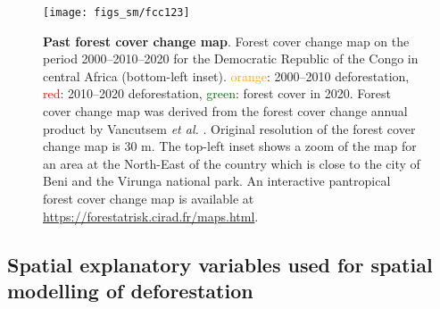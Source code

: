 \documentclass[
  12pt,
]{article}
\begin{document}
\begin{figure}[H]

{\centering \texttt{[image: figs\_sm/fcc123]} 

}

\caption{\textbf{Past forest cover change map}. Forest cover change map on the period 2000--2010--2020 for the Democratic Republic of the Congo in central Africa (bottom-left inset). \textcolor{orange}{orange}: 2000--2010 deforestation, \textcolor{red}{red}: 2010--2020 deforestation, \textcolor{darkgreen}{green}: forest cover in 2020. Forest cover change map was derived from the forest cover change annual product by Vancutsem \emph{et al.} \citep{Vancutsem2021}. Original resolution of the forest cover change map is 30 m. The top-left inset shows a zoom of the map for an area at the North-East of the country which is close to the city of Beni and the Virunga national park. An interactive pantropical forest cover change map is available at \url{https://forestatrisk.cirad.fr/maps.html}.}\label{fig:fcc-maps}
\end{figure}

\hypertarget{spatial-explanatory-variables-used-for-spatial-modelling-of-deforestation}{%
\subsection{Spatial explanatory variables used for spatial modelling of deforestation}\label{spatial-explanatory-variables-used-for-spatial-modelling-of-deforestation}}
\end{document}
